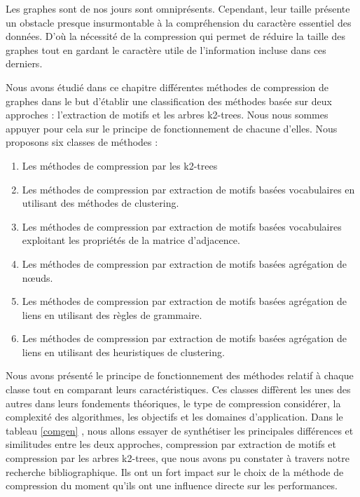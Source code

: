 Les graphes sont de nos jours sont omniprésents. Cependant, leur taille présente un obstacle presque insurmontable à la compréhension du caractère essentiel des données. D'où la nécessité de la compression qui permet de réduire la taille des graphes tout en gardant le caractère utile de l'information incluse dans ces derniers.

Nous avons étudié dans ce chapitre différentes méthodes de compression de graphes dans le but d'établir une classification des méthodes basée sur deux approches : l'extraction de motifs et les arbres k2-trees. Nous nous sommes appuyer pour cela sur le principe de fonctionnement de chacune d'elles. Nous  proposons six classes de méthodes :

\begin{enumerate}[label=\roman*]
\item  Les méthodes de compression par les k2-trees
	\item  Les méthodes de compression par extraction de motifs basées vocabulaires en utilisant des méthodes de clustering.
	\item  Les méthodes de compression par extraction de motifs basées vocabulaires exploitant les propriétés de la matrice d'adjacence.
	\item  Les méthodes de compression par extraction de motifs basées agrégation de nœuds.
	\item  Les méthodes de compression par extraction de motifs basées agrégation de liens en utilisant des règles de grammaire.
	\item  Les méthodes de compression par extraction de motifs basées agrégation de liens en utilisant des heuristiques de clustering.
\end{enumerate}
	
Nous avons présenté le principe de fonctionnement des méthodes relatif à chaque classe tout en comparant leurs caractéristiques. 
 Ces classes diffèrent les unes des autres dans leurs fondements théoriques, le type de compression considérer, la complexité des algorithmes, les objectifs et les domaines d'application. 
 Dans le tableau \ref{comgen} , nous allons essayer de synthétiser les principales différences et similitudes entre les deux approches, compression par extraction de motifs et compression par les arbres k2-trees, que nous avons pu constater à travers notre recherche bibliographique. Ils ont un fort impact sur le choix de la méthode de compression du moment qu'ils ont une influence directe sur les performances.
 
